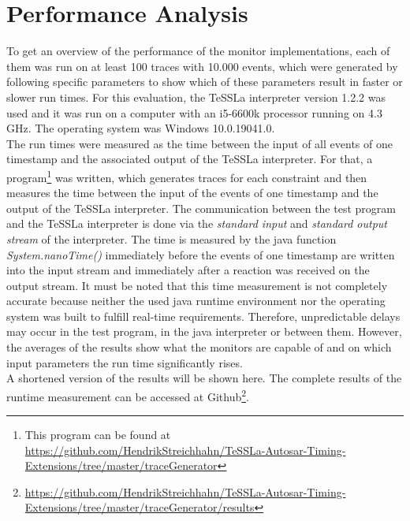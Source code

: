 \section{Performance Analysis}
\label{sec:performance}
To get an overview of the performance of the monitor implementations, each of them was run on at least 100 traces with 10.000 events, which were generated by following specific parameters to show which of these parameters result in faster or slower run times. For this evaluation, the TeSSLa interpreter version 1.2.2 was used and it was run on a computer with an i5-6600k processor running on 4.3 GHz. The operating system was Windows 10.0.19041.0.\\
The run times were measured as the time between the input of all events of one timestamp and the associated output of the TeSSLa interpreter. For that, a program\footnote{This program can be found at \href{https://github.com/HendrikStreichhahn/TeSSLa-Autosar-Timing-Extensions/tree/master/traceGenerator}{https://github.com/HendrikStreichhahn/TeSSLa-Autosar-Timing-Extensions/tree/master/traceGenerator}} was written, which generates traces for each constraint and then measures the time between the input of the events of one timestamp and the output of the TeSSLa interpreter. The communication between the test program and the TeSSLa interpreter is done via the \textit{standard input} and \textit{standard output stream} of the interpreter. The time is measured by the java function \textit{System.nanoTime()} immediately before the events of one timestamp are written into the input stream and immediately after a reaction was received on the output stream. It must be noted that this time measurement is not completely accurate because neither the used java runtime environment nor the operating system was built to fulfill real-time requirements. Therefore, unpredictable delays may occur in the test program, in the java interpreter or between them. However, the averages of the results show what the monitors are capable of and on which input parameters the run time significantly rises.\\
A shortened version of the results will be shown here. The complete results of the runtime measurement can be accessed at Github\footnote{\href{https://github.com/HendrikStreichhahn/TeSSLa-Autosar-Timing-Extensions/tree/master/traceGenerator/results}{https://github.com/HendrikStreichhahn/TeSSLa-Autosar-Timing-Extensions/tree/master/traceGenerator/results}}.



